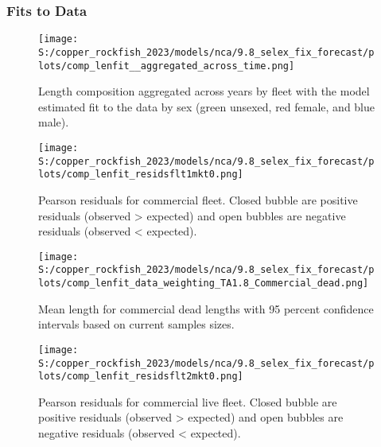 \documentclass[
  letterpaper,
]{article}
\begin{document}
\pagebreak

\hypertarget{fits-to-data}{%
\subsubsection{Fits to Data}\label{fits-to-data}}

\begin{figure}
\centering
\texttt{[image: S:/copper\_rockfish\_2023/models/nca/9.8\_selex\_fix\_forecast/plots/comp\_lenfit\_\_aggregated\_across\_time.png]}
\caption{Length composition aggregated across years by fleet with the model estimated fit to the data by sex (green unsexed, red female, and blue male).\label{fig:len-agg-fit}}
\end{figure}

\pagebreak

\begin{figure}
\centering
\texttt{[image: S:/copper\_rockfish\_2023/models/nca/9.8\_selex\_fix\_forecast/plots/comp\_lenfit\_residsflt1mkt0.png]}
\caption{Pearson residuals for commercial fleet. Closed bubble are positive residuals (observed \textgreater{} expected) and open bubbles are negative residuals (observed \textless{} expected).\label{fig:com-dead-pearson}}
\end{figure}

\pagebreak

\begin{figure}
\centering
\texttt{[image: S:/copper\_rockfish\_2023/models/nca/9.8\_selex\_fix\_forecast/plots/comp\_lenfit\_data\_weighting\_TA1.8\_Commercial\_dead.png]}
\caption{Mean length for commercial dead lengths with 95 percent confidence intervals based on current samples sizes.\label{fig:com-dead-mean-len-fit}}
\end{figure}

\pagebreak

\pagebreak

\begin{figure}
\centering
\texttt{[image: S:/copper\_rockfish\_2023/models/nca/9.8\_selex\_fix\_forecast/plots/comp\_lenfit\_residsflt2mkt0.png]}
\caption{Pearson residuals for commercial live fleet. Closed bubble are positive residuals (observed \textgreater{} expected) and open bubbles are negative residuals (observed \textless{} expected).\label{fig:com-live-pearson}}
\end{figure}

\pagebreak
\end{document}
